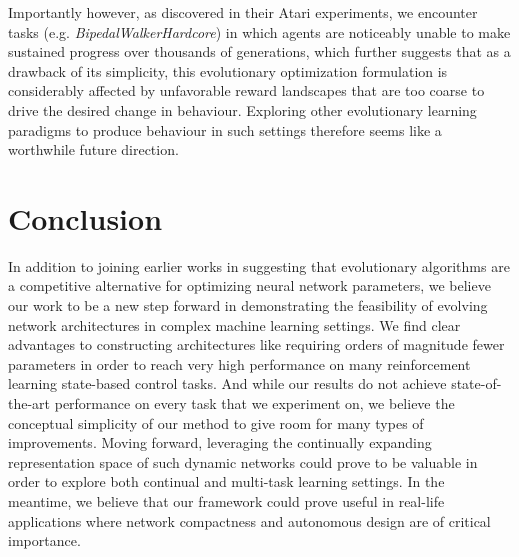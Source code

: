 \documentclass{article} %
\begin{document}
Importantly however, as \cite{such2017deep} discovered in their Atari experiments, we encounter tasks (e.g. \textit{BipedalWalkerHardcore}) in which agents are noticeably unable to make sustained progress over thousands of generations, which further suggests that as a drawback of its simplicity, this evolutionary optimization formulation is considerably affected by unfavorable reward landscapes that are too coarse to drive the desired change in behaviour. Exploring other evolutionary learning paradigms to produce behaviour in such settings therefore seems like a worthwhile future direction.

\vspace{-.5em}
\section{Conclusion}
\vspace{-.5em}

In addition to joining earlier works in suggesting that evolutionary algorithms are a competitive alternative for optimizing neural network parameters, we believe our work to be a new step forward in demonstrating the feasibility of evolving network architectures in complex machine learning settings. We find clear advantages to constructing architectures like requiring orders of magnitude fewer parameters in order to reach very high performance on many reinforcement learning state-based control tasks. And while our results do not achieve state-of-the-art performance on every task that we experiment on, we believe the conceptual simplicity of our method to give room for many types of improvements. Moving forward, leveraging the continually expanding representation space of such dynamic networks could prove to be valuable in order to explore both continual and multi-task learning settings. In the meantime, we believe that our framework could prove useful in real-life applications where network compactness and autonomous design are of critical importance.
\end{document}
